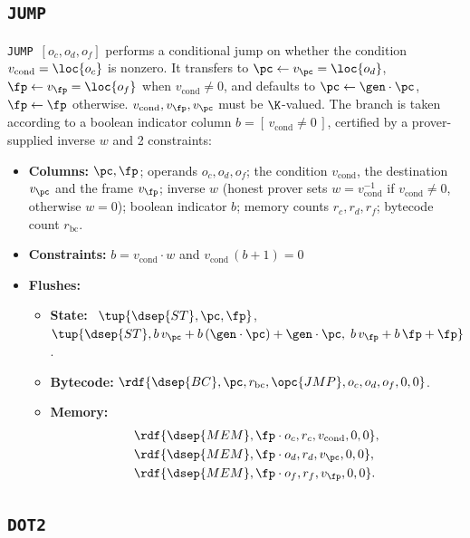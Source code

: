 \subsection{\texttt{JUMP}}\label{sec:tab-jump}

\texttt{JUMP}\ $[o_c,o_d,o_f]$ performs a conditional jump on whether the condition $v_{\mathrm{cond}}=\loc{o_c}$ is nonzero. It transfers to $\pc\gets v_{\pc} = \loc{o_d}$, $\fp\gets v_{\fp} = \loc{o_f}$ when $v_{\mathrm{cond}}\neq0$, and defaults to $\pc\gets\gen\cdot\pc$, $\fp\gets\fp$ otherwise. $v_{\mathrm{cond}}, v_{\fp}, v_{\pc}$ must be $\K$-valued. The branch is taken according to a boolean indicator column $b=[\,v_{\mathrm{cond}}\neq0\,]$, certified by a prover-supplied inverse $w$ and 2 constraints:

\begin{itemize}
\item \textbf{Columns:} $\pc,\fp$; operands $o_c,o_d,o_f$; the condition $v_{\mathrm{cond}}$, the destination $v_{\pc}$ and the frame $v_{\fp}$; inverse $w$ (honest prover sets $w = v_{\mathrm{cond}}^{-1}$ if $v_{\mathrm{cond}}\neq0$, otherwise $w=0$); boolean indicator $b$; memory counts $r_c,r_d,r_f$; bytecode count $r_{\mathrm{bc}}$.
\item \textbf{Constraints:}  $b=v_{\mathrm{cond}}\cdot w$ and $v_{\mathrm{cond}}\,(b+1)=0$
\item \textbf{Flushes:}
  \begin{itemize}
  \item \textbf{State:} \pull\ $\tup{\dsep{ST},\pc,\fp}$, \push\ $\tup{\dsep{ST},b\,v_{\pc}+b\,(\gen\cdot\pc)+\gen\cdot\pc,\;b\,v_{\fp}+b\,\fp+\fp}$.
  \item \textbf{Bytecode:} $\rdf{\dsep{BC},\pc,r_{\mathrm{bc}},\opc{JMP},o_c,o_d,o_f,0,0}$.
  \item \textbf{Memory:}
    \begin{align*}
      &\rdf{\dsep{MEM},\fp\cdot o_c,r_c,v_{\mathrm{cond}},0,0},\\
      &\rdf{\dsep{MEM},\fp\cdot o_d,r_d,v_{\pc},0,0},\\
      &\rdf{\dsep{MEM},\fp\cdot o_f,r_f,v_{\fp},0,0}.
    \end{align*}
  \end{itemize}
\end{itemize}

\subsection{\texttt{DOT2}}\label{sec:tab-dot2}

